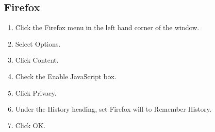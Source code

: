 \documentclass[hidelinks,english]{article}
\begin{document}
        \subsection{Firefox}
            \begin{enumerate}
                \item Click the Firefox menu in the left hand corner of the window.
                \item Select Options.
                \item Click Content.
                \item Check the Enable JavaScript box.
                \item Click Privacy.
                \item Under the History heading, set Firefox will to Remember History.
                \item Click OK.
            \end{enumerate}
            \begin{center}
            \end{center}
        \newpage
\end{document}
